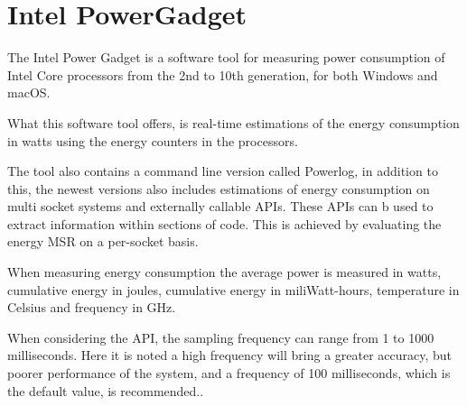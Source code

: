 \section{Intel PowerGadget}

The Intel Power Gadget\cite[]{powergadget} is a software tool for measuring power consumption of Intel Core processors from the 2nd to 10th generation, for both Windows and macOS.

What this software tool offers, is real-time estimations of the energy consumption in watts using the energy counters in the processors.

The tool also contains a command line version called Powerlog, in addition to this, the newest versions also includes estimations of energy consumption on multi socket systems and externally callable APIs. These APIs can b used to extract information within sections of code. This is achieved by evaluating the energy MSR on a per-socket basis.

When measuring energy consumption the average power is measured in watts, cumulative energy in joules, cumulative energy in miliWatt-hours, temperature in Celsius and frequency in GHz.

When considering the API, the sampling frequency can range from 1 to 1000 milliseconds. Here it is noted a high frequency will bring a greater accuracy, but poorer performance of the system, and a frequency of 100 milliseconds, which is the default value, is recommended.\cite*[]{powergadget_api}.